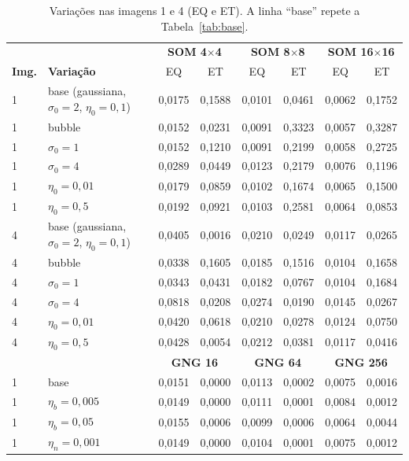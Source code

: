 \documentclass[11pt,a4paper]{article}
\begin{document}
\begin{table}[H]
\centering
\footnotesize
\caption{Variações nas imagens 1 e 4 (EQ e ET). A linha ``base'' repete a Tabela~\ref{tab:base}.}
\label{tab:variacoes}
\begin{tabular}{llcccccc}
\toprule
& & \multicolumn{2}{c}{\textbf{SOM 4$\times$4}} & \multicolumn{2}{c}{\textbf{SOM 8$\times$8}} & \multicolumn{2}{c}{\textbf{SOM 16$\times$16}} \\
\textbf{Img.} & \textbf{Variação} & EQ & ET & EQ & ET & EQ & ET \\
\midrule
1 & base (gaussiana, $\sigma_0 = 2$, $\eta_0 = 0{,}1$) & 0,0175 & 0,1588 & 0,0101 & 0,0461 & 0,0062 & 0,1752 \\
1 & bubble & 0,0152 & 0,0231 & 0,0091 & 0,3323 & 0,0057 & 0,3287 \\
1 & $\sigma_0 = 1$ & 0,0152 & 0,1210 & 0,0091 & 0,2199 & 0,0058 & 0,2725 \\
1 & $\sigma_0 = 4$ & 0,0289 & 0,0449 & 0,0123 & 0,2179 & 0,0076 & 0,1196 \\
1 & $\eta_0 = 0{,}01$ & 0,0179 & 0,0859 & 0,0102 & 0,1674 & 0,0065 & 0,1500 \\
1 & $\eta_0 = 0{,}5$ & 0,0192 & 0,0921 & 0,0103 & 0,2581 & 0,0064 & 0,0853 \\
4 & base (gaussiana, $\sigma_0 = 2$, $\eta_0 = 0{,}1$) & 0,0405 & 0,0016 & 0,0210 & 0,0249 & 0,0117 & 0,0265 \\
4 & bubble & 0,0338 & 0,1605 & 0,0185 & 0,1516 & 0,0104 & 0,1658 \\
4 & $\sigma_0 = 1$ & 0,0343 & 0,0431 & 0,0182 & 0,0767 & 0,0104 & 0,1684 \\
4 & $\sigma_0 = 4$ & 0,0818 & 0,0208 & 0,0274 & 0,0190 & 0,0145 & 0,0267 \\
4 & $\eta_0 = 0{,}01$ & 0,0420 & 0,0618 & 0,0210 & 0,0278 & 0,0124 & 0,0750 \\
4 & $\eta_0 = 0{,}5$ & 0,0428 & 0,0054 & 0,0212 & 0,0381 & 0,0117 & 0,0416 \\
\midrule
& & \multicolumn{2}{c}{\textbf{GNG 16}} & \multicolumn{2}{c}{\textbf{GNG 64}} & \multicolumn{2}{c}{\textbf{GNG 256}} \\
\midrule
1 & base & 0,0151 & 0,0000 & 0,0113 & 0,0002 & 0,0075 & 0,0016 \\
1 & $\eta_b = 0{,}005$ & 0,0149 & 0,0000 & 0,0111 & 0,0001 & 0,0084 & 0,0012 \\
1 & $\eta_b = 0{,}05$ & 0,0155 & 0,0006 & 0,0099 & 0,0006 & 0,0064 & 0,0044 \\
1 & $\eta_n = 0{,}001$ & 0,0149 & 0,0000 & 0,0104 & 0,0001 & 0,0075 & 0,0012 \\

\end{tabular}
\end{table}
\end{document}
